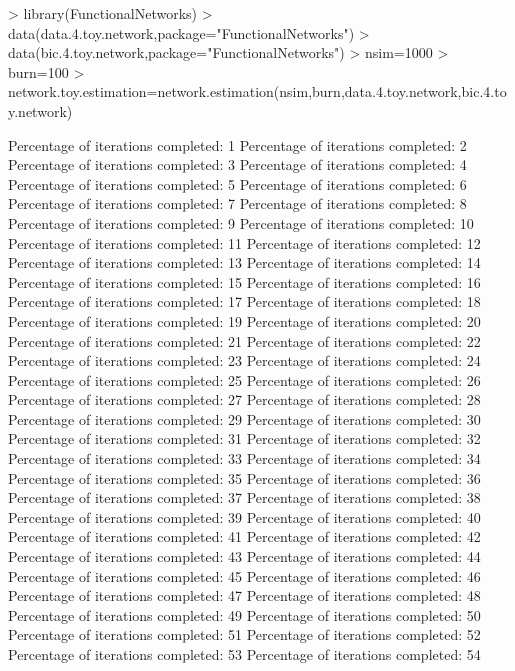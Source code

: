 \documentclass[12pt]{article}
\begin{document}
\begin{Schunk}
\begin{Sinput}
> library(FunctionalNetworks)
> data(data.4.toy.network,package="FunctionalNetworks")
> data(bic.4.toy.network,package="FunctionalNetworks")
> nsim=1000
> burn=100
> network.toy.estimation=network.estimation(nsim,burn,data.4.toy.network,bic.4.toy.network)
\end{Sinput}
\begin{Soutput}
Percentage of iterations completed: 1 
Percentage of iterations completed: 2 
Percentage of iterations completed: 3 
Percentage of iterations completed: 4 
Percentage of iterations completed: 5 
Percentage of iterations completed: 6 
Percentage of iterations completed: 7 
Percentage of iterations completed: 8 
Percentage of iterations completed: 9 
Percentage of iterations completed: 10 
Percentage of iterations completed: 11 
Percentage of iterations completed: 12 
Percentage of iterations completed: 13 
Percentage of iterations completed: 14 
Percentage of iterations completed: 15 
Percentage of iterations completed: 16 
Percentage of iterations completed: 17 
Percentage of iterations completed: 18 
Percentage of iterations completed: 19 
Percentage of iterations completed: 20 
Percentage of iterations completed: 21 
Percentage of iterations completed: 22 
Percentage of iterations completed: 23 
Percentage of iterations completed: 24 
Percentage of iterations completed: 25 
Percentage of iterations completed: 26 
Percentage of iterations completed: 27 
Percentage of iterations completed: 28 
Percentage of iterations completed: 29 
Percentage of iterations completed: 30 
Percentage of iterations completed: 31 
Percentage of iterations completed: 32 
Percentage of iterations completed: 33 
Percentage of iterations completed: 34 
Percentage of iterations completed: 35 
Percentage of iterations completed: 36 
Percentage of iterations completed: 37 
Percentage of iterations completed: 38 
Percentage of iterations completed: 39 
Percentage of iterations completed: 40 
Percentage of iterations completed: 41 
Percentage of iterations completed: 42 
Percentage of iterations completed: 43 
Percentage of iterations completed: 44 
Percentage of iterations completed: 45 
Percentage of iterations completed: 46 
Percentage of iterations completed: 47 
Percentage of iterations completed: 48 
Percentage of iterations completed: 49 
Percentage of iterations completed: 50 
Percentage of iterations completed: 51 
Percentage of iterations completed: 52 
Percentage of iterations completed: 53 
Percentage of iterations completed: 54 

\end{Soutput}
\end{Schunk}
\end{document}

